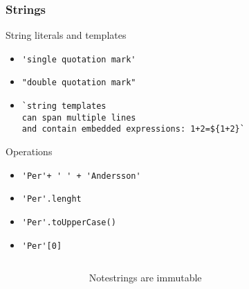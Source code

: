 \begin{frame}[fragile]
  \frametitle{Strings}
String literals and templates
\begin{itemize}
  \item \verb|'single quotation mark'|
  \item \verb|"double quotation mark"|
  \item \verb|`string templates| \\
           \verb|can span multiple lines| \\
           \verb|and contain embedded expressions: 1+2=${1+2}`|
\end{itemize}
Operations
\begin{itemize}
  \item \verb|'Per'+ ' ' + 'Andersson'|
  \item \verb|'Per'.lenght|
  \item \verb|'Per'.toUpperCase()|
  \item \verb|'Per'[0]|
\end{itemize}
\begin{columns}[onlytextwidth]
  \begin{column}{0.3\textwidth}  \end{column}
  \begin{column}{0.4\textwidth}
    \begin{alertblock}{Note}strings are immutable \end{alertblock}
  \end{column}
  \begin{column}{0.3\textwidth}  \end{column}
\end{columns}%
 \end{frame}
